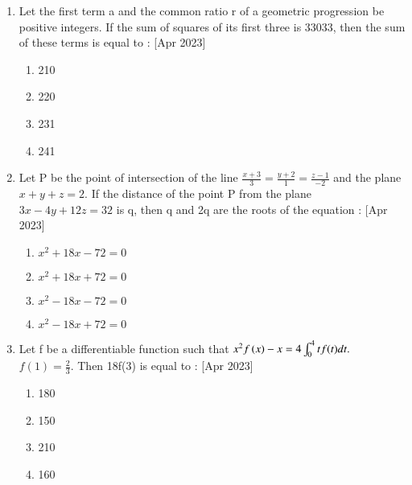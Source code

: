 \documentclass[journal]{IEEEtran}
\begin{document}
\begin{enumerate}
    \item Let the first term a and the common ratio r of a geometric progression be positive integers. If the sum of squares of its first three is 33033, then the sum of these terms is equal to :
     \hfill{[Apr 2023]}
    \begin{multicols}{4}
            \begin{enumerate}
              \item 210
              \item 220
              \item 231
              \item 241
            \end{enumerate}
        \end{multicols}
    
    

    \item Let P  be the point of intersection of the line $\frac{x+3}{3}=\frac{y+2}{1}=\frac{z-1}{-2}$ and the plane  $x+y+z=2$. If the distance of the point P from the plane $3x-4y+12z=32$ is q, then q and 2q are the roots of the equation :
     \hfill{[Apr 2023]}
    \begin{multicols}{4}
            \begin{enumerate}
              \item $x^2+18x-72=0$
              \item $x^2+18x+72=0$
              \item $x^2-18x-72=0$
              \item $x^2-18x+72=0$
            \end{enumerate}
        \end{multicols}
    \item Let f be a differentiable function such that $x^2f\left(x\right)-x=4\int_{0}^{4} tf(t)dt.$ $f(1)=\frac{2}{3}$. Then 18f(3) is  equal to :
     \hfill{[Apr 2023]}
    \begin{multicols}{4}
            \begin{enumerate}
              \item 180
              \item 150
              \item 210
              \item 160
            \end{enumerate}
        \end{multicols}
    

\end{enumerate}
\end{document}
